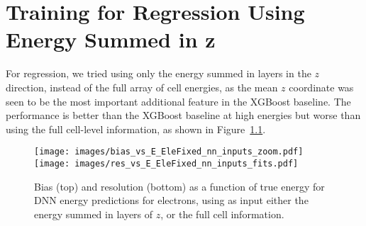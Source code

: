 \chapter{Training for Regression Using Energy Summed in z}\label{app:z_sum_regression}

For regression, we tried using only the energy summed in layers in the $z$ direction, instead of the full array of cell energies, as the mean $z$ coordinate was seen to be the most important additional feature in the XGBoost baseline.  The performance is better than the XGBoost baseline at high energies but worse than using the full cell-level information, as shown in Figure~\ref{fig:reg_dnn_inputs}.

\begin{figure}[htbp]
\centering
\texttt{[image: images/bias\_vs\_E\_EleFixed\_nn\_inputs\_zoom.pdf]}
\texttt{[image: images/res\_vs\_E\_EleFixed\_nn\_inputs\_fits.pdf]}
\caption{Bias (top) and resolution (bottom) as a function of true energy for DNN energy predictions for electrons, using as input either the energy summed in layers of $z$, or the full cell information.\label{fig:reg_dnn_inputs}}
\end{figure}